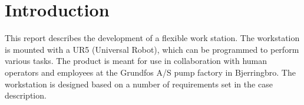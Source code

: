 \chapter{Introduction} \label{ch:introduction}

This report describes the development of a flexible work station. The workstation is mounted with a UR5 (Universal Robot), which can be programmed to perform various tasks. The product is meant for use in collaboration with human operators and employees at the Grundfos A/S pump factory in Bjerringbro. The workstation is designed based on a number of requirements set in the case description. 

